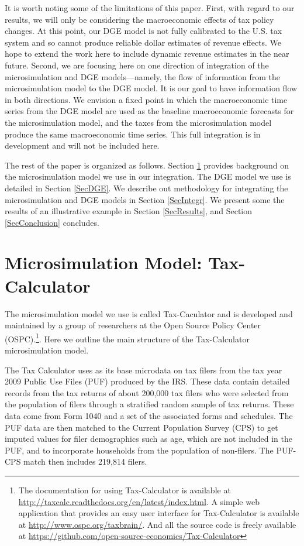 \documentclass[letterpaper,12pt]{article}
\theoremstyle{definition}
\begin{document}
\begin{spacing}{1.5}
  It is worth noting some of the limitations of this paper. First, with regard to our results, we will only be considering the macroeconomic effects of tax policy changes. At this point, our DGE model is not fully calibrated to the U.S. tax system and so cannot produce reliable dollar estimates of revenue effects. We hope to extend the work here to include dynamic revenue estimates in the near future. Second, we are focusing here on one direction of integration of the microsimulation and DGE models---namely, the flow of information from the microsimulation model to the DGE model. It is our goal to have information flow in both directions. We envision a fixed point in which the macroeconomic time series from the DGE model are used as the baseline macroeconomic forecasts for the microsimulation model, and the taxes from the microsimulation model produce the same macroeconomic time series. This full integration is in development and will not be included here.

  The rest of the paper is organized as follows. Section \ref{SecMicrosim} provides background on the microsimulation model we use in our integration. The DGE model we use is detailed in Section \ref{SecDGE}.  We describe out methodology for integrating the microsimulation and DGE models in Section \ref{SecIntegr}. We present some the results of an illustrative example in Section \ref{SecResults}, and Section \ref{SecConclusion} concludes.


\section{Microsimulation Model: Tax-Calculator}\label{SecMicrosim}

  The microsimulation model we use is called Tax-Caculator and is developed and maintained by a group of researchers at the Open Source Policy Center (OSPC).\footnote{The documentation for using Tax-Calculator is available at \href{http://taxcalc.readthedocs.org/en/latest/index.html}{http://taxcalc.readthedocs.org/en/latest/index.html}. A simple web application that provides an easy user interface for Tax-Calculator is available at \href{http://www.ospc.org/taxbrain/}{http://www.ospc.org/taxbrain/}. And all the source code is freely available at \href{https://github.com/open-source-economics/Tax-Calculator}{https://github.com/open-source-economics/Tax-Calculator}}. Here we outline the main structure of the Tax-Calculator microsimulation model.

  The Tax Calculator uses as its base microdata on tax filers from the tax year 2009 Public Use Files (PUF) produced by the IRS. These data contain detailed records from the tax returns of about 200,000 tax filers who were selected from the population of filers through a stratified random sample of tax returns. These data come from Form 1040 and a set of the associated forms and schedules. The PUF data are then matched to the Current Population Survey (CPS) to get imputed values for filer demographics such as age, which are not included in the PUF, and to incorporate households from the population of non-filers. The PUF-CPS match then includes 219,814 filers.


\end{spacing}
\end{document}

